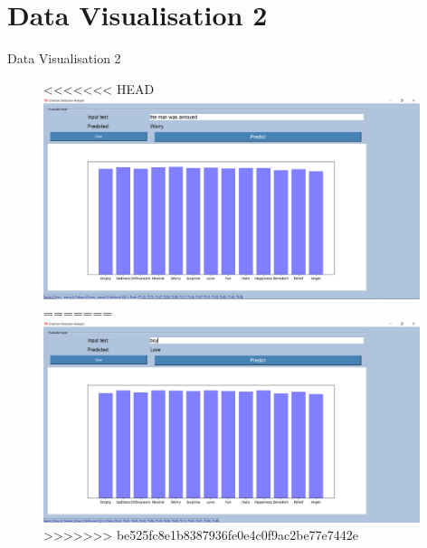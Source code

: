 \documentclass{beamer}
\begin{document}
\section{Data Visualisation 2}
\begin{frame}{Data Visualisation 2}
\begin{figure}[H]
\centering
<<<<<<< HEAD
\includegraphics[width=110mm]{DV4.png}
=======
\includegraphics[width=110mm]{DV2.png}
>>>>>>> be525fc8e1b8387936fe0e4c0f9ac2be77e7442e
\end{figure}
\end{frame}
\end{document}
